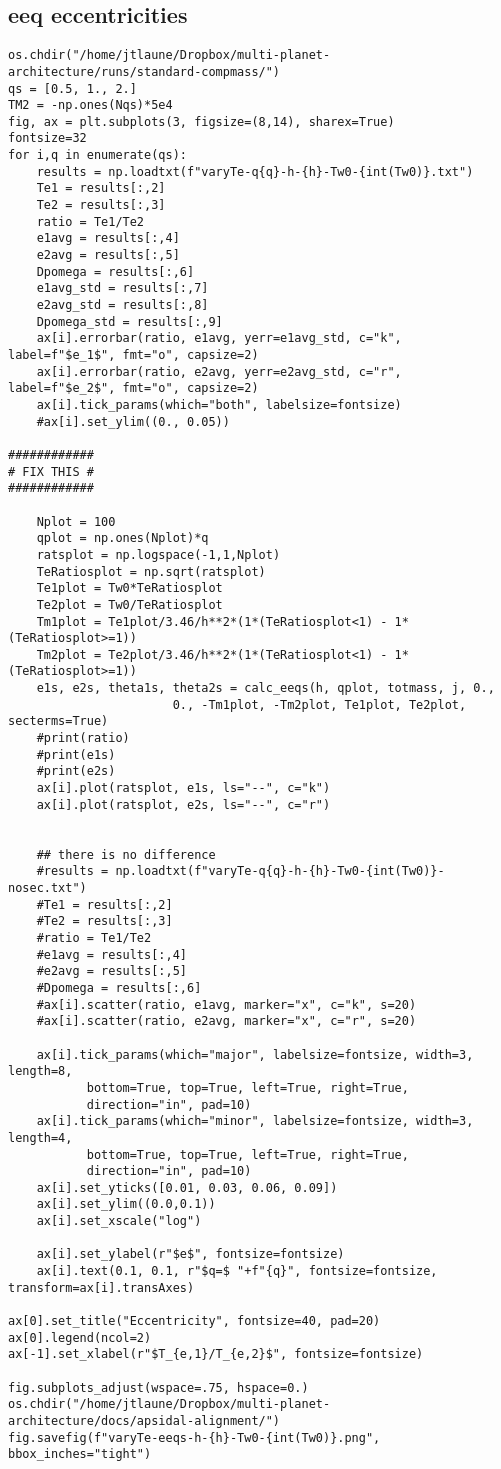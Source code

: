 \documentclass[11pt]{article}
\begin{document}
\subsection{eeq eccentricities}
\label{sec:org264f2b8}
\begin{verbatim}
os.chdir("/home/jtlaune/Dropbox/multi-planet-architecture/runs/standard-compmass/")
qs = [0.5, 1., 2.]
TM2 = -np.ones(Nqs)*5e4
fig, ax = plt.subplots(3, figsize=(8,14), sharex=True)
fontsize=32
for i,q in enumerate(qs):
    results = np.loadtxt(f"varyTe-q{q}-h-{h}-Tw0-{int(Tw0)}.txt")
    Te1 = results[:,2]
    Te2 = results[:,3]
    ratio = Te1/Te2
    e1avg = results[:,4]
    e2avg = results[:,5]
    Dpomega = results[:,6]
    e1avg_std = results[:,7]
    e2avg_std = results[:,8]
    Dpomega_std = results[:,9]
    ax[i].errorbar(ratio, e1avg, yerr=e1avg_std, c="k", label=f"$e_1$", fmt="o", capsize=2)
    ax[i].errorbar(ratio, e2avg, yerr=e2avg_std, c="r", label=f"$e_2$", fmt="o", capsize=2)
    ax[i].tick_params(which="both", labelsize=fontsize)
    #ax[i].set_ylim((0., 0.05))

############
# FIX THIS #
############

    Nplot = 100
    qplot = np.ones(Nplot)*q
    ratsplot = np.logspace(-1,1,Nplot)
    TeRatiosplot = np.sqrt(ratsplot)
    Te1plot = Tw0*TeRatiosplot
    Te2plot = Tw0/TeRatiosplot
    Tm1plot = Te1plot/3.46/h**2*(1*(TeRatiosplot<1) - 1*(TeRatiosplot>=1))
    Tm2plot = Te2plot/3.46/h**2*(1*(TeRatiosplot<1) - 1*(TeRatiosplot>=1))
    e1s, e2s, theta1s, theta2s = calc_eeqs(h, qplot, totmass, j, 0.,
					   0., -Tm1plot, -Tm2plot, Te1plot, Te2plot, secterms=True)
    #print(ratio)
    #print(e1s)
    #print(e2s)
    ax[i].plot(ratsplot, e1s, ls="--", c="k")
    ax[i].plot(ratsplot, e2s, ls="--", c="r")


    ## there is no difference
    #results = np.loadtxt(f"varyTe-q{q}-h-{h}-Tw0-{int(Tw0)}-nosec.txt")
    #Te1 = results[:,2]
    #Te2 = results[:,3]
    #ratio = Te1/Te2
    #e1avg = results[:,4]
    #e2avg = results[:,5]
    #Dpomega = results[:,6]
    #ax[i].scatter(ratio, e1avg, marker="x", c="k", s=20)
    #ax[i].scatter(ratio, e2avg, marker="x", c="r", s=20)

    ax[i].tick_params(which="major", labelsize=fontsize, width=3, length=8,
		   bottom=True, top=True, left=True, right=True,
		   direction="in", pad=10)
    ax[i].tick_params(which="minor", labelsize=fontsize, width=3, length=4,
		   bottom=True, top=True, left=True, right=True,
		   direction="in", pad=10)
    ax[i].set_yticks([0.01, 0.03, 0.06, 0.09])
    ax[i].set_ylim((0.0,0.1))
    ax[i].set_xscale("log")

    ax[i].set_ylabel(r"$e$", fontsize=fontsize)
    ax[i].text(0.1, 0.1, r"$q=$ "+f"{q}", fontsize=fontsize, transform=ax[i].transAxes)

ax[0].set_title("Eccentricity", fontsize=40, pad=20)
ax[0].legend(ncol=2)
ax[-1].set_xlabel(r"$T_{e,1}/T_{e,2}$", fontsize=fontsize)

fig.subplots_adjust(wspace=.75, hspace=0.)
os.chdir("/home/jtlaune/Dropbox/multi-planet-architecture/docs/apsidal-alignment/")
fig.savefig(f"varyTe-eeqs-h-{h}-Tw0-{int(Tw0)}.png", bbox_inches="tight")
\end{verbatim}
\end{document}
